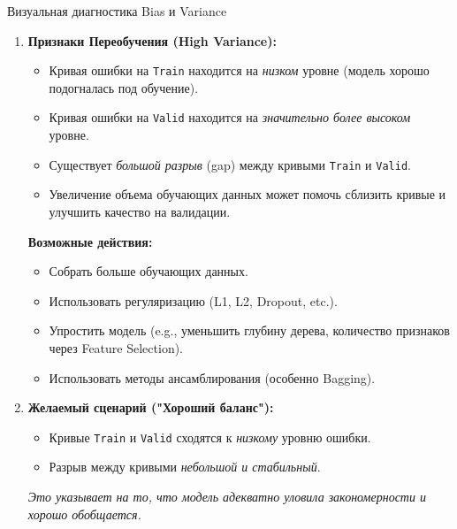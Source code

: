 \begin{myexampleblock}{Визуальная диагностика Bias и Variance}
\begin{enumerate}[label=\arabic*., wide, labelindent=0pt, itemsep=1ex]
        \item \textbf{Признаки Переобучения (High Variance):}
            \begin{itemize}[nosep, leftmargin=*, itemsep=0.5ex]
                \item Кривая ошибки на \texttt{Train} находится на \textit{низком} уровне (модель хорошо подогналась под обучение).
                \item Кривая ошибки на \texttt{Valid} находится на \textit{значительно более высоком} уровне.
                \item Существует \textit{большой разрыв} (gap) между кривыми \texttt{Train} и \texttt{Valid}.
                \item Увеличение объема обучающих данных может помочь сблизить кривые и улучшить качество на валидации.
            \end{itemize}
            \textbf{Возможные действия:}
            \begin{itemize}[label=\textbullet, nosep, leftmargin=*]
                 \item Собрать больше обучающих данных.
                 \item Использовать регуляризацию (L1, L2, Dropout, etc.).
                 \item Упростить модель (e.g., уменьшить глубину дерева, количество признаков через Feature Selection).
                 \item Использовать методы ансамблирования (особенно Bagging).
            \end{itemize}

        \item \textbf{Желаемый сценарий ("Хороший баланс"):}
            \begin{itemize}[nosep, leftmargin=*, itemsep=0.5ex]
                \item Кривые \texttt{Train} и \texttt{Valid} сходятся к \textit{низкому} уровню ошибки.
                \item Разрыв между кривыми \textit{небольшой и стабильный}.
            \end{itemize}
             \textit{Это указывает на то, что модель адекватно уловила закономерности и хорошо обобщается.}
    \end{enumerate}
\end{myexampleblock}